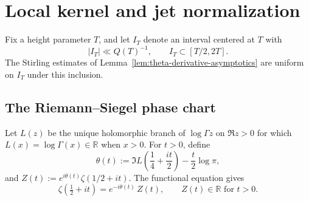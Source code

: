%

\section{Local kernel and jet normalization}
\label{sec:local-kernel-and-jet-normalization}
\quad
{}\quad
{}\quad
{}\quad
{}\quad
{}
\par\medskip

Fix a height parameter \(T\), and let \(I_T\) denote an interval
centered at \(T\) with
\[
        |I_T|\ll Q(T)^{-1},
        \qquad I_T\subset [T/2,2T].
\]
The Stirling estimates of
Lemma~\ref{lem:theta-derivative-asymptotics} are uniform on \(I_T\)
under this inclusion.

\subsection{The Riemann--Siegel phase chart}
\label{subsec:local-phase-chart}

\begin{definition}
\label{def:riemann-siegel-phase}
Let \(L(z)\) be the unique holomorphic branch of \(\log\Gamma z\) on
\(\Re z>0\) for which \(L(x)=\log\Gamma(x)\in\mathbb R\) when \(x>0\).
For \(t>0\), define
\begin{equation}
\label{eq:theta-definition}
 \theta(t)
 := \Im L\!\left(\frac14+\frac{it}{2}\right)
    -\frac{t}{2}\log\pi,
\end{equation}
and \(Z(t):=e^{i\theta(t)}\zeta(1/2+it)\).  The functional equation
gives
\[
        \zeta\!\left(\tfrac12+it\right)
        =e^{-i\theta(t)}\,Z(t),
        \qquad Z(t)\in\mathbb R \text{ for } t>0.
\]
\end{definition}


